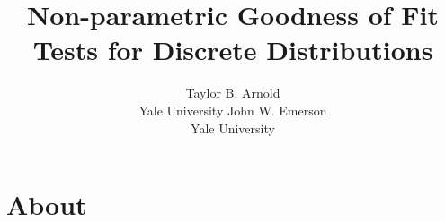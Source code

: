 \documentclass[codesnippet]{jss}
\author{Taylor B. Arnold\\Yale University \And 
        John W. Emerson\\Yale University}
\title{Non-parametric Goodness of Fit Tests for Discrete Distributions}
\begin{document}

\section[About Java]{About }
\end{document}
